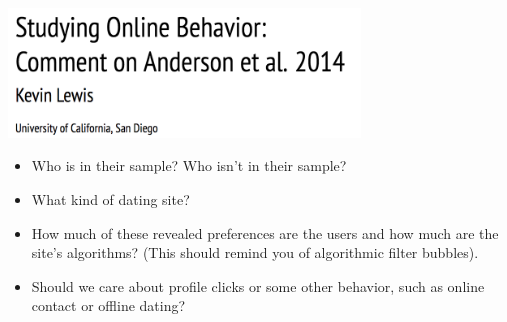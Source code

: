 \documentclass[aspectratio=169]{beamer}
\begin{document}
\begin{frame}

\begin{center}
\includegraphics[width=0.7\textwidth]{figures/lewis_studying_2015_title}
\end{center}

\end{frame}
\begin{frame}

\begin{itemize}
\item Who is in their sample? Who isn't in their sample?
\pause
\item What kind of dating site? 
\pause
\item How much of these revealed preferences are the users and how much are the site's algorithms? (This should remind you of algorithmic filter bubbles).
\pause
\item Should we care about profile clicks or some other behavior, such as online contact or offline dating?
\end{itemize}

\end{frame}
\end{document}
